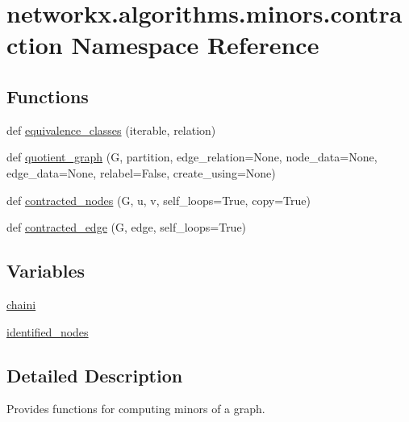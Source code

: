 \hypertarget{namespacenetworkx_1_1algorithms_1_1minors_1_1contraction}{}\section{networkx.\+algorithms.\+minors.\+contraction Namespace Reference}
\label{namespacenetworkx_1_1algorithms_1_1minors_1_1contraction}
\subsection*{Functions}
\begin{DoxyCompactItemize}
\item 
def \hyperlink{namespacenetworkx_1_1algorithms_1_1minors_1_1contraction_a13fe9669829712f1abad4f163fa1f47f}{equivalence\+\_\+classes} (iterable, relation)
\item 
def \hyperlink{namespacenetworkx_1_1algorithms_1_1minors_1_1contraction_acc9085f86a927aaca2b68c75c8159478}{quotient\+\_\+graph} (G, partition, edge\+\_\+relation=None, node\+\_\+data=None, edge\+\_\+data=None, relabel=False, create\+\_\+using=None)
\item 
def \hyperlink{namespacenetworkx_1_1algorithms_1_1minors_1_1contraction_a5a73989f1385b02ae61c43822ae88786}{contracted\+\_\+nodes} (G, u, v, self\+\_\+loops=True, copy=True)
\item 
def \hyperlink{namespacenetworkx_1_1algorithms_1_1minors_1_1contraction_a23064252ea6c3b996c5da4525c739ede}{contracted\+\_\+edge} (G, edge, self\+\_\+loops=True)
\end{DoxyCompactItemize}
\subsection*{Variables}
\begin{DoxyCompactItemize}
\item 
\hyperlink{namespacenetworkx_1_1algorithms_1_1minors_1_1contraction_ade1bb2de987b9e078277f643fe4afac6}{chaini}
\item 
\hyperlink{namespacenetworkx_1_1algorithms_1_1minors_1_1contraction_ad098f10b7aeb21669d450643503f706d}{identified\+\_\+nodes}
\end{DoxyCompactItemize}


\subsection{Detailed Description}
\begin{DoxyVerb}Provides functions for computing minors of a graph.\end{DoxyVerb}
 

